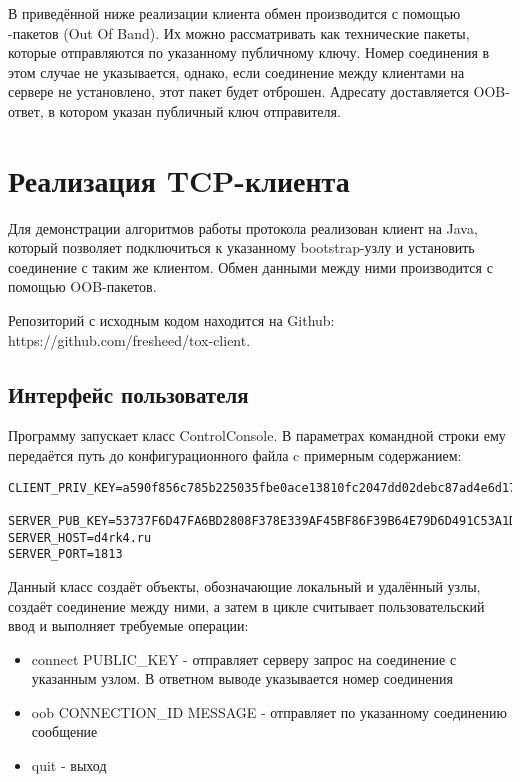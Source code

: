 \documentclass{/home/fresheed/utils/latex/university-templates/lab-report}
\begin{document}
В приведённой ниже реализации клиента обмен производится с помощью -пакетов (Out Of Band). Их можно рассматривать как технические пакеты, которые отправляются по указанному публичному ключу. Номер соединения в этом случае не указывается, однако, если соединение между клиентами на сервере не установлено, этот пакет будет отброшен. Адресату доставляется OOB-ответ, в котором указан публичный ключ отправителя.


\section{Реализация TCP-клиента}

Для демонстрации алгоритмов работы протокола реализован клиент на Java, который позволяет подключиться к указанному bootstrap-узлу и установить соединение с таким же клиентом. Обмен данными между ними производится с помощью OOB-пакетов. 

Репозиторий с исходным кодом находится на Github: https://github.com/fresheed/tox-client.

\subsection{Интерфейс пользователя}

Программу запускает класс ControlConsole. В параметрах командной строки ему передаётся путь до конфигурационного файла c примерным содержанием:
\begin{verbatim}
CLIENT_PRIV_KEY=a590f856c785b225035fbe0ace13810fc2047dd02debc87ad4e6d17403967e5e

SERVER_PUB_KEY=53737F6D47FA6BD2808F378E339AF45BF86F39B64E79D6D491C53A1D522E7039
SERVER_HOST=d4rk4.ru
SERVER_PORT=1813
\end{verbatim}

Данный класс создаёт объекты, обозначающие локальный и удалённый узлы, создаёт соединение между ними, а затем в цикле считывает пользовательский ввод и выполняет требуемые операции:

\begin{itemize}
\item connect PUBLIC\_KEY - отправляет серверу запрос на соединение с указанным узлом. В ответном выводе указывается номер соединения
\item oob CONNECTION\_ID MESSAGE - отправляет по указанному соединению сообщение
\item quit - выход
\end{itemize}
\end{document}
